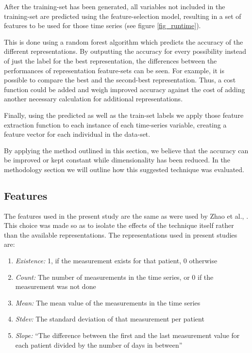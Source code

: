 \documentclass[conference]{IEEEtran}
\begin{document}
After the training-set has been generated, all variables not included in the training-set are predicted using the feature-selection model, resulting in a set of features to be used for those time series (see figure \ref{fig_runtime}). 

This is done using a random forest algorithm which predicts the accuracy of the different representations. By outputting the accuracy for every possibility instead of just the label for the best representation, the differences between the performances of representation feature-sets can be seen. For example, it is possible to compare the best and the second-best representation. Thus, a cost function could be added and weigh improved accuracy against the cost of adding another necessary calculation for additional representations.

Finally, using the predicted as well as the train-set labels we apply those feature extraction function to each instance of each time-series variable, creating a feature vector for each individual in the data-set.

By applying the method outlined in this section, we believe that the accuracy can be improved or kept constant while dimensionality has been reduced. In the methodology section we will outline how this suggested technique was evaluated.

\subsection{Features}
The features used in the present study are the same as were used by Zhao et al., \cite{zhao2014}. This choice was made so as to isolate the effects of the technique itself rather than the available representations. The representations used in present studies are: 
\begin{enumerate}
    \item \emph{Existence:} 1, if the measurement exists for that patient, 0 otherwise
    \item \emph{Count:} The number of measurements in the time series, or 0 if the measurement was not done
    \item \emph{Mean:} The mean value of the measurements in the time series
    \item \emph{Stdev:} The standard deviation of that measurement per patient
    \item \emph{Slope:} ``The difference between the first and the last measurement value for each patient divided by the number of days in between''\cite{zhao2014}
\end{enumerate}
\end{document}
